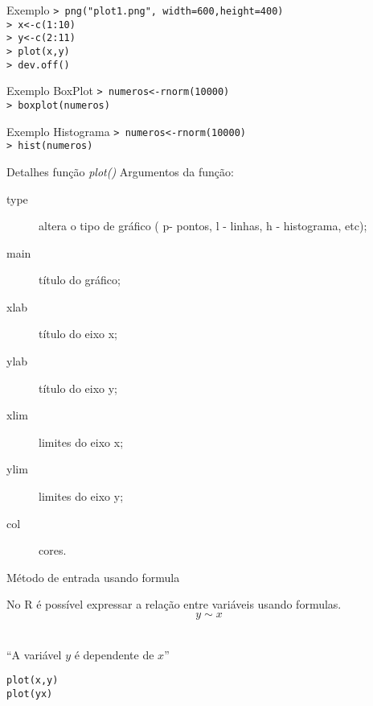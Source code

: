 \documentclass{beamer}
\begin{document}
\begin{frame}{Exemplo}
\texttt{> png("plot1.png", width=600,height=400)\\
> x<-c(1:10)\\
> y<-c(2:11)\\
> plot(x,y)\\
> dev.off()\\}
\centering

\end{frame}

\begin{frame}{Exemplo BoxPlot}
  \texttt{> numeros<-rnorm(10000) \\
    > boxplot(numeros)
}
\centering

\end{frame}

\begin{frame}{Exemplo Histograma}
  \texttt{> numeros<-rnorm(10000) \\
    > hist(numeros)
}
\centering

\end{frame}

\begin{frame}{Detalhes função \textit{plot()}}
Argumentos da função:

\begin{description}
\item[type] altera o tipo de gráfico ( p- pontos, l - linhas, h - histograma, etc);
\item[main] título do gráfico;
\item[xlab] título do eixo x;
\item[ylab] título do eixo y;
\item[xlim] limites do eixo x;
\item[ylim] limites do eixo y;
\item[col] cores.
\end{description}
  
\end{frame}


\begin{frame}{Método de entrada usando formula}

No R é possível expressar a relação entre variáveis usando formulas.\\
\[y \sim x\] \\ 
\begin{center}
  ``A variável $y$ é dependente de $x$''
\end{center}
\texttt{plot(x,y)\\
plot(y\texttildelow x)}  
\end{frame}
\end{document}
